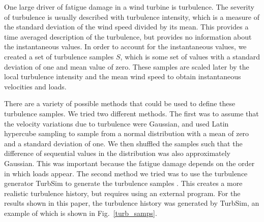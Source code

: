 \documentclass[11pt,letterpaper]{article}
\begin{document}
% 

One large driver of fatigue damage in a wind turbine is turbulence. The severity of turbulence is usually described with turbulence intensity, which is a measure of the standard deviation of the wind speed divided by its mean. This provides a time averaged description of the turbulence, but provides no information about the instantaneous values. In order to account for the instantaneous values, we created a set of turbulence samples $S$, which is some set of values with a standard deviation of one and mean value of zero. These samples are scaled later by the local turbulence intensity and the mean wind speed to obtain instantaneous velocities and loads. 

There are a variety of possible methods that could be used to define these turbulence samples. We tried two different methods. The first was to assume that the velocity variations due to turbulence were Gaussian, and used Latin hypercube sampling to sample from a normal distribution with a mean of zero and a standard deviation of one. We then shuffled the samples such that the difference of sequential values in the distribution was also approximately Gaussian. This was important because the fatigue damage depends on the order in which loads appear. The second method we tried was to use the turbulence generator TurbSim to generate the turbulence samples \cite{jonkman2006turbsim}. This creates a more realistic turbulence history, but requires using an external program. For the results shown in this paper, the turbulence history was generated by TurbSim, an example of which is shown in Fig.~\ref{turb_samps}.
\end{document}
